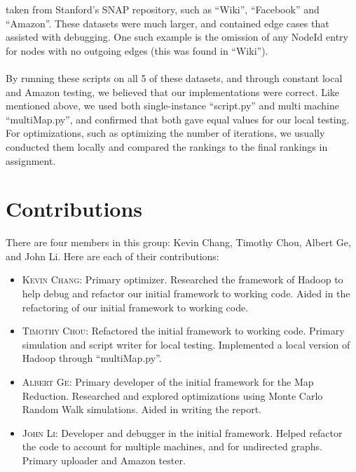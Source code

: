 \documentclass{article}
\begin{document}
 taken from Stanford's SNAP repository, such as ``Wiki'', ``Facebook'' and ``Amazon''. These 
 datasets were much larger, and contained edge cases that assisted with debugging. One such example is the omission of any NodeId entry for nodes with no outgoing edges (this was found in ``Wiki'').
 \\ \\
 By running these scripts on all 5 of these datasets, and through constant local and Amazon testing, we believed that our implementations were correct. Like mentioned above, we used both single-instance ``script.py'' and multi machine ``multiMap.py'', and confirmed that both gave equal values for our local testing. For optimizations, such as optimizing the number of iterations, we usually conducted them locally and compared the rankings to the final rankings in assignment. 

\section{Contributions}
There are four members in this group: Kevin Chang, Timothy Chou, Albert Ge, and John Li. Here are each of their contributions:
\begin{itemize}
  \item \textsc{Kevin Chang}: Primary optimizer. Researched the framework of Hadoop to help debug and refactor our initial framework to working code. Aided in the refactoring of our initial framework to working code.
  \item \textsc{Timothy Chou}: Refactored the initial framework to working code. Primary simulation and script writer for local testing. Implemented a local version of Hadoop through ``multiMap.py''.
  \item \textsc{Albert Ge}: Primary developer of the initial framework for the Map Reduction. Researched and explored optimizations using Monte Carlo Random Walk simulations. Aided in writing the report.
  \item \textsc{John Li}: Developer and debugger in the initial framework. Helped refactor the code to account for multiple machines, and for undirected graphs. Primary uploader and Amazon tester. 
 \end{itemize}
\end{document}

